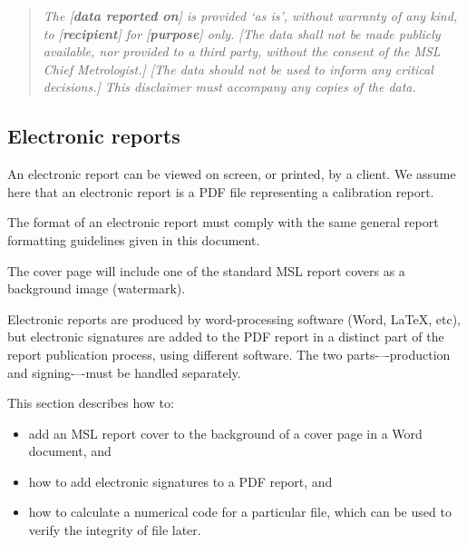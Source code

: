 \begin{quote}
\textit{The [\textbf{data reported on}] is provided `as is', without warranty of any kind, to [\textbf{recipient}] for [\textbf{purpose}] only. [{The data shall not be made publicly available, nor provided to a third party, without the consent of the MSL Chief Metrologist.}] [The data should not be used to inform any critical decisions.] This disclaimer must accompany any copies of the data.}
\end{quote}

\subsection{Electronic reports}
 \label{ss:electronic_reports}
An electronic report can be viewed on screen, or printed, by a client. We assume here that an electronic report is a PDF file representing a calibration report. 

The format of an electronic report must comply with the same general report formatting guidelines given in this document. 

The cover page will include one of the standard MSL report covers as a background image (watermark).

Electronic reports are produced by word-processing software (Word, LaTeX, etc), but electronic signatures are added to the PDF report in a distinct part of the report publication process, using different software. The two parts-–-production and signing-–-must be handled separately. 
 
This section describes how to: 
\begin{itemize}
\item	add an MSL report cover to the background of a cover page in a Word document, and
\item	how to add electronic signatures to a PDF report, and 
\item	how to calculate a numerical code for a particular file, which can be used to verify the integrity of file later.
\end{itemize}

